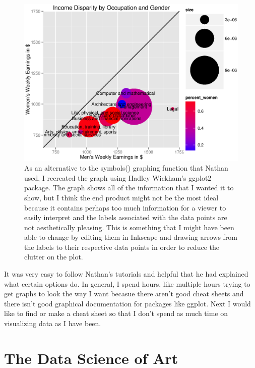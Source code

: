 \documentclass{article}
\begin{document}
\begin{figure}[H]
\begin{center}
\includegraphics[width=1\columnwidth]{gender.eps}
\caption{As an alternative to the symbols() graphing function that Nathan used, I recreated the graph using Hadley Wickham's ggplot2 package.  The graph shows all of the information that I wanted it to show, but I think the end product might not be the most ideal because it contains perhaps too much information for a viewer to easily interpret and the labels associated with the data points are not aesthetically pleasing.  This is something that I might have been able to change by editing them in Inkscape and drawing arrows from the labels to their respective data points in order to reduce the clutter on the plot.}
\end{center}
\end{figure}

It was very easy to follow Nathan's tutorials and helpful that he had explained what certain options do.  In general, I spend hours, like multiple hours trying to get graphs to look the way I want becasue there aren't good cheat sheets and there isn't good graphical documentation for packages like ggplot.  Next I would like to find or make a cheat sheet so that I don't spend as much time on visualizing data as I have been.

\section{The Data Science of Art}
\end{document}

